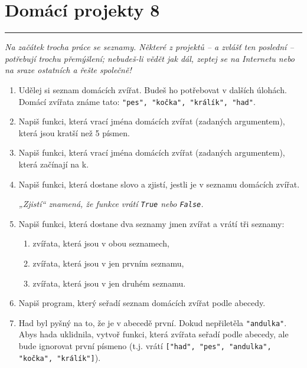 \documentclass[a4paper,10pt]{article}
\newcommand\plsetno{8}
\newcommand\startsection[1]{
     \vspace{0.2ex}
    \hrule
    {\fontspec{Oxygen} \tiny
     \vspace{-1ex}
     \emph{#1}
     \vspace{-1.5em}
    }
}
\begin{document}
\section*{Domácí projekty \plsetno}

\startsection{Na začátek trocha práce se seznamy.
    Některé z projektů – a zvlášť ten poslední – potřebují trochu přemýšlení;
    nebudeš-li vědět jak dál, zeptej se na Internetu nebo na sraze ostatních
    a řešte společně!}

\begin{enumerate}

\item Udělej si seznam domácích zvířat. Budeš ho potřebovat v dalších úlohách.
    \\Domácí zvířata známe tato: \verb+"pes", "kočka", "králík", "had"+.


\item Napiš funkci, která vrací jména domácích zvířat (zadaných argumentem), která jsou kratší než 5 písmen.

\item Napiš funkci, která vrací jména  domácích zvířat (zadaných argumentem), která začínají na k.

\item Napiš funkci, která dostane slovo a zjistí,
    jestli je v seznamu domácích zvířat.

    \emph{„Zjistí“ znamená, že funkce vrátí \texttt{True} nebo \texttt{False}.}

\item Napiš funkci, která dostane dva seznamy jmen zvířat a vrátí tři seznamy:
    \begin{enumerate}
        \item zvířata, která jsou v obou seznamech,
        \item zvířata, která jsou v jen prvním seznamu,
        \item zvířata, která jsou v jen druhém seznamu.
    \end{enumerate}

\item Napiš program, který seřadí seznam domácích zvířat podle abecedy.

\item Had byl pyšný na to, že je v abecedě první.
    Dokud nepřiletěla \verb+"andulka"+.
    \\Abys hada uklidnila, vytvoř funkci, která zvířata seřadí podle abecedy,
    ale bude ignorovat první písmeno (t.j. vrátí
        \texttt{["h{\color{plpink}ad}",
                 "p{\color{plpink}es}",
                 "a{\color{plpink}ndulka}",
                 "k{\color{plpink}očka}",
                 "k{\color{plpink}rálík}"]}).


\end{enumerate}
\end{document}
